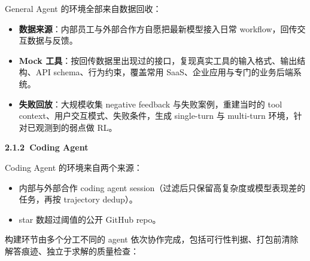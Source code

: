 \documentclass[zihao=false,fontset=windows]{ctexart}
\begin{document}
General Agent 的环境全部来自数据回收：\par
\begin{itemize}
\item 
\textbf{数据来源}：内部员工与外部合作方自愿把最新模型接入日常 workflow，回传交互数据与反馈。\par
\item 
\textbf{Mock 工具}：按回传数据里出现过的接口，复现真实工具的输入格式、输出结构、API schema、行为约束，覆盖常用 SaaS、企业应用与专门的业务后端系统。\par
\item 
\textbf{失败回放}：大规模收集 negative feedback 与失败案例，重建当时的 tool context、用户交互模式、失败条件，生成 single-turn 与 multi-turn 环境，针对已观测到的弱点做 RL。\par
\end{itemize}

\par{}\vspace{0.8em}\noindent \begin{tcolorbox}[boxrule=0pt,arc=3pt,colback=callGreen,left=3pt,right=3pt,top=2pt,bottom=2pt,before skip=0pt,after skip=0pt]{\bfseries \textcolor{feishuBlue}{2.1.2}\ Coding Agent}\end{tcolorbox}\par\vspace{0.28em}

Coding Agent 的环境来自两个来源：\par
\begin{itemize}
\item 
内部与外部合作 coding agent session（过滤后只保留高复杂度或模型表现差的任务，再按 trajectory dedup）。\par
\item 
star 数超过阈值的公开 GitHub repo。\par
\end{itemize}

构建环节由多个分工不同的 agent 依次协作完成，包括可行性判据、打包前清除解答痕迹、独立于求解的质量检查：\par
\end{document}
